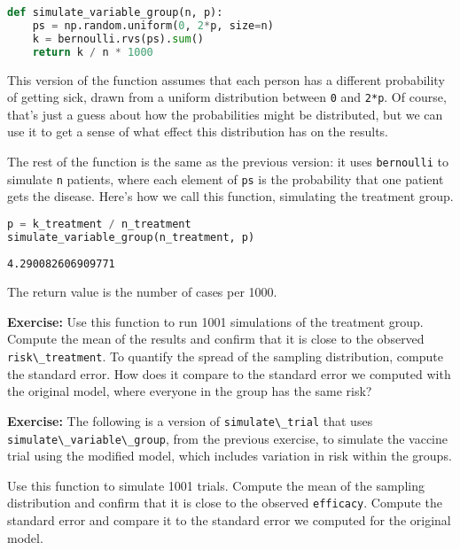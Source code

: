 \begin{lstlisting}[language=Python,style=source]
def simulate_variable_group(n, p):
    ps = np.random.uniform(0, 2*p, size=n)
    k = bernoulli.rvs(ps).sum()
    return k / n * 1000
\end{lstlisting}

This version of the function assumes that each person has a different
probability of getting sick, drawn from a uniform distribution between
\passthrough{\lstinline!0!} and \passthrough{\lstinline!2*p!}. Of
course, that's just a guess about how the probabilities might be
distributed, but we can use it to get a sense of what effect this
distribution has on the results.

The rest of the function is the same as the previous version: it uses
\passthrough{\lstinline!bernoulli!} to simulate
\passthrough{\lstinline!n!} patients, where each element of
\passthrough{\lstinline!ps!} is the probability that one patient gets
the disease. Here's how we call this function, simulating the treatment
group.

\begin{lstlisting}[language=Python,style=source]
p = k_treatment / n_treatment
simulate_variable_group(n_treatment, p)
\end{lstlisting}

\begin{lstlisting}[style=output]
4.290082606909771
\end{lstlisting}

The return value is the number of cases per 1000.

\textbf{Exercise:} Use this function to run 1001 simulations of the
treatment group. Compute the mean of the results and confirm that it is
close to the observed \passthrough{\lstinline!risk\_treatment!}. To
quantify the spread of the sampling distribution, compute the standard
error. How does it compare to the standard error we computed with the
original model, where everyone in the group has the same risk?

\textbf{Exercise:} The following is a version of
\passthrough{\lstinline!simulate\_trial!} that uses
\passthrough{\lstinline!simulate\_variable\_group!}, from the previous
exercise, to simulate the vaccine trial using the modified model, which
includes variation in risk within the groups.

Use this function to simulate 1001 trials. Compute the mean of the
sampling distribution and confirm that it is close to the observed
\passthrough{\lstinline!efficacy!}. Compute the standard error and
compare it to the standard error we computed for the original model.

